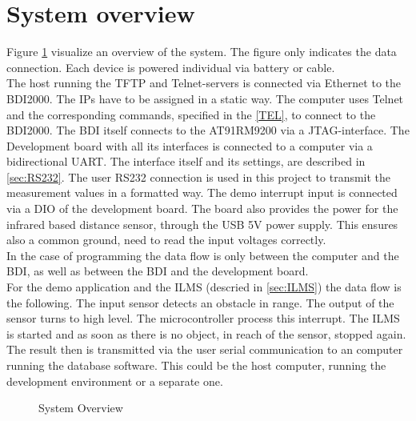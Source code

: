 \section{System overview}
\label{sysoverview}
Figure \ref{fig:sysov} visualize an overview of the system. The figure only indicates the data connection. Each device is powered individual via battery or cable.\\
The host running the \ac{TFTP} and Telnet-servers is connected via Ethernet to the BDI2000. The IPs have to be assigned in a static way. The computer uses Telnet and the corresponding commands, specified in the \autoref{TEL}, to connect to the BDI2000. The BDI itself connects to the AT91RM9200 via a \ac{JTAG}-interface. The Development board with all its interfaces is connected to a computer via a bidirectional \ac{UART}. The interface itself and its settings, are described in \autoref{sec:RS232}. The user RS232 connection is used in this project to transmit the measurement values in a formatted way. The demo interrupt input is connected via a \ac{DIO} of the development board. The board also provides the power for the infrared based distance sensor, through the \ac{USB} 5V power supply. This ensures also a common ground, need to read the input voltages correctly.\\ 
In the case of programming the data flow is only between the computer and the BDI, as well as between the BDI and the development board.\\
For the demo application and the \ac{ILMS} (descried in \autoref{sec:ILMS}) the data flow is the following. The input sensor detects an obstacle in range. The output of the sensor turns to high level. The microcontroller process this interrupt. The \ac{ILMS} is started and as soon as there is no object, in reach of the sensor, stopped again. The result then is transmitted via the user serial communication to an computer running the database software. This could be the host computer, running the development environment or a separate one.

\begin{figure}[H]
		\begin{center}

	

		\end{center}
		\caption{System Overview}
		\label{fig:sysov}
\end{figure}


